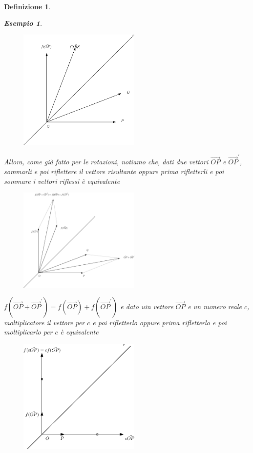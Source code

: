 \documentclass{book}
\newtheorem{definizione}{Definizione}
\newtheorem{esempio}{Esempio}
\begin{document}
\begin{definizione}
\begin{esempio}
    \begin{figure}[th]
      \centering
        \includegraphics[width=6cm]{img/finiti/imgex4-2-4.eps}
    \end{figure}   
    Allora, come già fatto per le rotazioni, notiamo che, dati due vettori $\vec{OP}$ e $\vec{OP}^\prime$,
    sommarli e poi riflettere il vettore risultante oppure prima rifletterli e poi sommare i vettori riflessi
    è equivalente
    \clearpage
    \begin{figure}[th]
      \centering
        \includegraphics[width=6cm]{img/finiti/imgex4-2-5.eps}
    \end{figure}
    $f\left(\vec{OP}+\vec{OP}^\prime\right)=f\left(\vec{OP}\right)+f\left(\vec{OP}^\prime\right)$ e
    dato uin vettore $\vec{OP}$ e un numero
    reale $c$, moltiplicatore il vettore per $c$ e poi rifletterlo oppure prima rifletterlo e poi moltiplicarlo
    per $c$ è equivalente
    \begin{figure}[th]
      \centering
        \includegraphics[width=6cm]{img/finiti/imgex4-2-6.eps}
    \end{figure}
      

\end{esempio}
\end{definizione}
\end{document}
